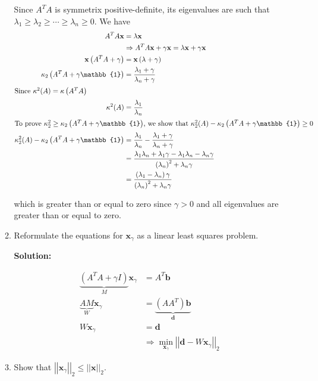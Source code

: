 \documentclass[12pt]{article}
\newcommand{\norm}[1]{\left|\left| #1 \right|\right|}
\newcommand{\vect}{\mathbf}
\newcommand{\Id}{\mathbb{1}}
\renewcommand{\P}[1]{\left( #1 \right)}
\begin{document}
\begin{enumerate}
\begin{enumerate}
  Since $A^{T}A$ is symmetrix positive-definite, its eigenvalues are such that
  $\lambda_{1} \geq \lambda_{2} \geq \cdots \geq \lambda_{n} \geq 0$. We have
  \begin{align*}
    A^{T}A\vect{x} &= \lambda\vect{x}\\
    &\Rightarrow A^{T}A\vect{x} + \gamma\vect{x} = \lambda\vect{x} + \gamma\vect{x}\\
    \vect{x} \P{A^{T}A + \gamma} &= \vect{x}\P{\lambda + \gamma}\\
    \kappa_{2}\P{A^{T}A + \gamma\Id} &= \frac{\lambda_{1} + \gamma}{\lambda_{n} + \gamma}\\
    \intertext{Since $\kappa^{2}(A) = \kappa\P{A^{T}A}$}
    \kappa^{2}(A) &= \frac{\lambda_{1}}{\lambda_{n}}\\
    \intertext{To prove $\kappa_{2}^{2} \geq \kappa_{2}\P{A^{T}A + \gamma\Id}$, we show that $\kappa_{2}^{2}(A) - \kappa_{2}\P{A^{T}A + \gamma\Id} \geq 0$}
    \kappa_{2}^{2}(A) - \kappa_{2}\P{A^{T}A + \gamma\Id} &= \frac{\lambda_{1}}{\lambda_{n}} - \frac{\lambda_{1} + \gamma}{\lambda_{n} + \gamma}\\
    &= \frac{\lambda_{1}\lambda_{n} + \lambda_{1}\gamma - \lambda_{1}\lambda_{n} - \lambda_{n}\gamma}{\P{\lambda_{n}}^{2} + \lambda_{n}\gamma}\\
    &= \frac{\P{\lambda_{1} - \lambda_{n}}\gamma}{\P{\lambda_{n}}^{2} + \lambda_{n}\gamma}
  \end{align*}

  which is greater than or equal to zero since $\gamma > 0$ and all eigenvalues are greater than or equal to zero.

  \item Reformulate the equations for $\mathbf{x}_{\gamma}$ as a linear least
  squares problem.

  {\bf Solution:}

  \begin{align*}
    \underbrace{\left( A^{T}A + \gamma I\right)}_{M}\mathbf{x}_{\gamma} &= A^{T}\mathbf{b}\\
    \underbrace{AM}_{W}\vect{x}_{\gamma} &= \underbrace{\P{AA^{T}}\vect{b}}_{\vect{d}}\\
    W\vect{x}_{\gamma} &= \vect{d}\\
    &\Rightarrow \min_{\vect{x}_{\gamma}}\norm{\vect{d} - W\vect{x}_{\gamma}}_{2}
  \end{align*}

  \item Show that $\norm{\mathbf{x}_{\gamma}}_{2} \leq \norm{\mathbf{x}}_{2}$.


\end{enumerate}
\end{enumerate}
\end{document}
